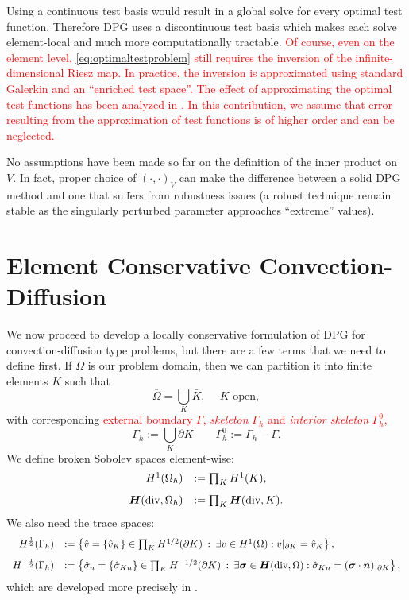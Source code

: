 \documentclass[letterpaper]{article}
\newcommand{\eqnref}[1]{\eqref{eq:#1}}
\newcommand{\LRp}[1]{\left( #1 \right)}
\newcommand{\ptl}{{\partial}}
\newcommand{\bfsig}{\mbox{\boldmath $\sigma$}}
\newcommand{\bfn}{\mbox{\boldmath $n$}}
\newcommand{\bfH}{\mbox{\boldmath $H$}}
\newcommand{\red}[1]{\textcolor{red}{#1}}
\begin{document}
Using a continuous test basis would result in a global solve for every optimal
test function. Therefore DPG uses a discontinuous test basis which makes each
solve element-local and much more computationally tractable. 
\red{
Of course, even on the element level, \eqnref{optimaltestproblem} still requires the inversion of the infinite-dimensional 
Riesz map. In practice, the inversion is approximated using standard Galerkin and an ``enriched test
space''. The effect of approximating the optimal test functions has been analyzed in \cite{practicalDPG}.
In this contribution, we assume that error resulting from the approximation of test functions
is of higher order and can be neglected.
}

No assumptions have been made so far on the definition of the inner product on
$V$. In fact, proper choice of $\LRp{\cdot,\cdot}_V$ can make the difference
between a solid DPG method and one that suffers from robustness issues 
(a robust technique remain stable as the singularly perturbed parameter approaches ``extreme'' values).

\section{Element Conservative Convection-Diffusion}
We now proceed to develop a locally conservative formulation of DPG for
convection-diffusion type problems, but there are a few terms that we need to
define first. If $\Omega$ is our problem domain, then we can partition it into
finite elements $K$ such that
\[
\overline{\Omega} = \bigcup_K  \bar{K},\: \quad K \text { open},
\]
with corresponding \red{external boundary $\Gamma$, {\em skeleton} $\Gamma_h$ and {\em interior
  skeleton} $\Gamma_h^0$,}
\[
\Gamma_h := \bigcup_K \partial K\qquad \Gamma_h^0 := \Gamma_h - \Gamma.
\]
We define broken Sobolev spaces element-wise:
\[
\begin{array}{rl}
H^1(\Omega_h) & := \prod_K H^1(K), \\[8pt]
\bfH(\text{div},\Omega_h) & := \prod_K \bfH(\text{div},K).
\end{array}
\]
We also need the trace spaces:
\[
\begin{array}{rl}
H^\frac{1}{2}(\Gamma_h) & := \left\{ \hat{v} = \{\hat{v}_K \} \in \prod_K H^{1/2}(\ptl K) \: :
\: \exists v \in H^1(\Omega) : v|_{\ptl K} = \hat{v}_K \right\}, \\[8pt]
H^{-\frac{1}{2}}(\Gamma_h) & := \left\{ {\hat{\sigma}}_n = \{ {\hat{\sigma}}_{Kn} \}\in \prod_K H^{-1/2}(\ptl K) \: : \: \exists \bfsig \in \bfH(\text{div},\Omega)
: {\hat{\sigma}}_{Kn} = (\bfsig \cdot \bfn)|_{\ptl K} \right\},
\end{array}
\]
which are developed more precisely in \cite{DPGStokes}.
\end{document}
